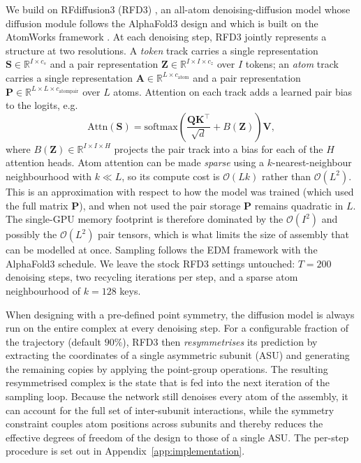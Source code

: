 We build on RFdiffusion3 (RFD3) \parencite{butcher_novo_2025}, an all-atom denoising-diffusion model whose
diffusion module follows the AlphaFold3 design
\parencite{abramsonAccurateStructurePrediction2024} and which is
built on the AtomWorks framework \parencite{corleyAcceleratingBiomolecularModeling2025}. At each denoising step, RFD3 jointly represents a
structure at two resolutions. A \emph{token} track carries a single
representation $\mathbf{S} \in \mathbb{R}^{I \times c_s}$ and a pair representation
$\mathbf{Z} \in \mathbb{R}^{I \times I \times c_z}$ over $I$ tokens; an \emph{atom} track
carries a single representation $\mathbf{A} \in \mathbb{R}^{L \times c_\text{atom}}$ and a pair representation
$\mathbf{P} \in \mathbb{R}^{L \times L \times c_\text{atompair}}$ over $L$ atoms. Attention
on each track adds a learned pair bias to the logits, e.g.
%
\begin{equation}
  \mathrm{Attn}(\mathbf{S}) = \mathrm{softmax}\!\left(\frac{\mathbf{Q}\mathbf{K}^\top}{\sqrt{d}} + B(\mathbf{Z})\right)\mathbf{V},
  \label{eq:pair-bias-attn}
\end{equation}
%
where $B(\mathbf{Z}) \in \mathbb{R}^{I \times I \times H}$ projects the pair track into a
bias for each of the $H$ attention heads. Atom attention can be made \emph{sparse}
using a $k$-nearest-neighbour neighbourhood with $k \ll L$, so its compute cost is
$\mathcal{O}(Lk)$ rather than $\mathcal{O}(L^2)$. This is an approximation with respect to 
how the model was trained (which used the full matrix $\mathbf{P}$), and when not used the pair storage $\mathbf{P}$
remains quadratic in $L$. The single-GPU memory footprint is
therefore dominated by the $\mathcal{O}(I^2)$ and possibly the $\mathcal{O}(L^2)$ pair tensors,
which is what limits the size of assembly that can be modelled at once.
Sampling follows the EDM framework \parencite{karras_elucidating_2022} with the
AlphaFold3 schedule. We leave the stock RFD3 settings untouched:
$T=200$ denoising steps, two recycling iterations per step, and a sparse atom
neighbourhood of $k=128$ keys.

When designing with a pre-defined point symmetry, the diffusion model is always
run on the entire complex at every denoising step. For a configurable fraction of
the trajectory (default $90\%$), RFD3 then \emph{resymmetrises} its prediction by
extracting the coordinates of a single asymmetric subunit (ASU) and generating the
remaining copies by applying the point-group operations. The resulting
resymmetrised complex is the state that is fed into the next iteration of the
sampling loop. Because the network still denoises every atom of the assembly, it
can account for the full set of inter-subunit interactions, while the symmetry
constraint couples atom positions across subunits and thereby reduces the
effective degrees of freedom of the design to those of a single ASU. The per-step
procedure is set out in Appendix~\ref{app:implementation}.

